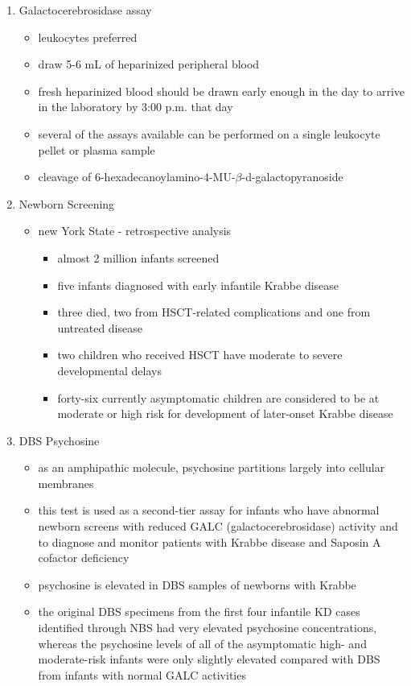 \documentclass{scrartcl}
\begin{document}
\begin{enumerate}
\begin{enumerate}
\item Galactocerebrosidase assay
\label{sec:org94eb8c1}
\begin{itemize}
\item leukocytes preferred
\item draw 5-6 mL of heparinized peripheral blood
\item fresh heparinized blood should be drawn early enough in the day to arrive in the laboratory by 3:00 p.m. that day
\item several of the assays available can be performed on a single leukocyte pellet or plasma sample
\item cleavage of 6-hexadecanoylamino-4-MU-\(\beta\)-d-galactopyranoside
\end{itemize}
\item Newborn Screening
\label{sec:orgd54c0a7}
\begin{itemize}
\item new York State - retrospective analysis
\begin{itemize}
\item almost 2 million infants screened
\item five infants diagnosed with early infantile Krabbe disease
\item three died, two from HSCT-related complications and one from untreated disease
\item two children who received HSCT have moderate to severe developmental delays
\item forty-six currently asymptomatic children are considered to be at
moderate or high risk for development of later-onset Krabbe disease
\end{itemize}
\end{itemize}

\item DBS Psychosine
\label{sec:org4442001}
\begin{itemize}
\item as an amphipathic molecule, psychosine partitions largely into
cellular membranes
\item this test is used as a second-tier assay for infants who have
abnormal newborn screens with reduced GALC (galactocerebrosidase)
activity and to diagnose and monitor patients with Krabbe disease
and Saposin A cofactor deficiency

\item psychosine is elevated in DBS samples of newborns with Krabbe

\item the original DBS specimens from the first four infantile
KD cases identified through NBS had very elevated psychosine
concentrations, whereas the psychosine levels of all of the
asymptomatic high- and moderate-risk infants were only slightly
elevated compared with DBS from infants with normal GALC activities
\end{itemize}


\end{enumerate}
\end{enumerate}
\end{document}

